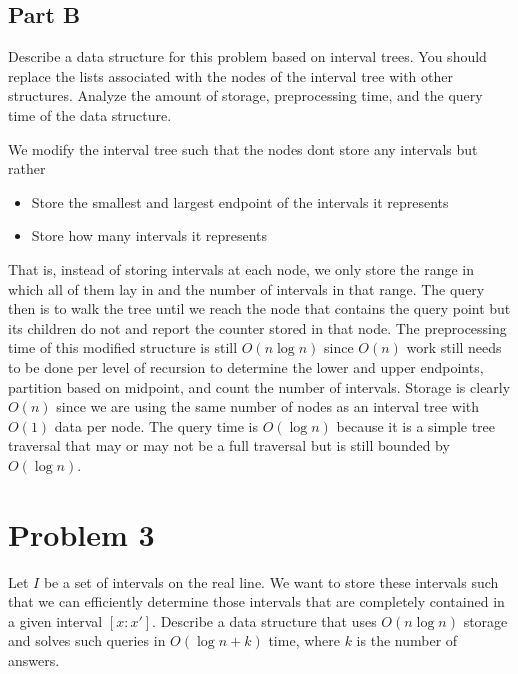\documentclass[12pt]{extarticle}
\begin{document}
\subsection*{Part B}
Describe a data structure for this problem based on interval trees. You should replace the lists associated with the nodes of the interval tree with other structures. Analyze the amount of storage, preprocessing time, and the query time of the data structure.

\begin{solution}
    We modify the interval tree such that the nodes dont store any intervals but rather
    \begin{itemize}
        \item Store the smallest and largest endpoint of the intervals it represents
        \item Store how many intervals it represents
    \end{itemize}
    That is, instead of storing intervals at each node, we only store the range in which all of them lay in and the number of intervals in that range. The query then is to walk the tree until we reach the node that contains the query point but its children do not and report the counter stored in that node. The preprocessing time of this modified structure is still $O(n \log n)$ since $O(n)$ work still needs to be done per level of recursion to determine the lower and upper endpoints, partition based on midpoint, and count the number of intervals. Storage is clearly $O(n)$ since we are using the same number of nodes as an interval tree with $O(1)$ data per node. The query time is $O(\log n)$ because it is a simple tree traversal that may or may not be a full traversal but is still bounded by $O(\log n)$.
\end{solution}

\section*{Problem 3}
Let $I$ be a set of intervals on the real line. We want to store these intervals such that we can efficiently determine those intervals that are completely contained in a given interval $[x : x']$. Describe a data structure that uses $O(n \log n)$ storage and solves such queries in $O(\log n+k)$ time, where $k$ is the number of answers.
\end{document}
